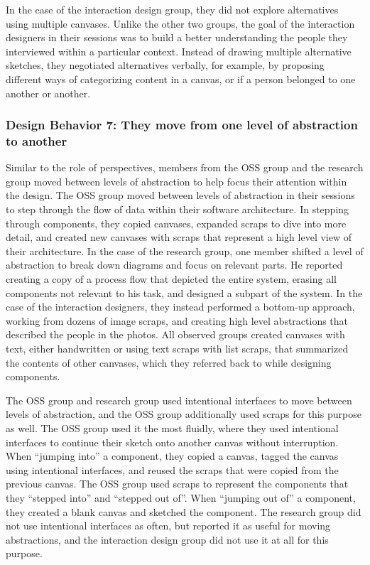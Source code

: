In the case of the interaction design group, they did not explore alternatives using multiple canvases. Unlike the other two groups, the goal of the interaction designers in their sessions was to build a better understanding the people they interviewed within a particular context. Instead of drawing multiple alternative sketches, they negotiated alternatives verbally, for example, by proposing different ways of categorizing content in a canvas, or if a person belonged to one another or another.

\subsubsection{Design Behavior 7: They move from one level of abstraction to another}

Similar to the role of perspectives, members from the OSS group and the research group moved between levels of abstraction to help focus their attention within the design. The OSS group moved between levels of abstraction in their sessions to step through the flow of data within their software architecture. In stepping through components, they copied canvases, expanded scraps to dive into more detail, and created new canvases with scraps that represent a high level view of their architecture. In the case of the research group, one member shifted a level of abstraction to break down diagrams and focus on relevant parts. He reported creating a copy of a process flow that depicted the entire system, erasing all components not relevant to his task, and designed a subpart of the system. In the case of the interaction designers, they instead performed a bottom-up approach, working from dozens of image scraps, and creating high level abstractions that described the people in the photos. All observed groups created canvases with text, either handwritten or using text scraps with list scraps, that summarized the contents of other canvases, which they referred back to while designing components. 

The OSS group and research group used intentional interfaces to move between levels of abstraction, and the OSS group additionally used scraps for this purpose as well. The OSS group used it the most fluidly, where they used intentional interfaces to continue their sketch onto another canvas without interruption. When ``jumping into'' a component, they copied a canvas, tagged the canvas using intentional interfaces, and reused the scraps that were copied from the previous canvas.  The OSS group used scraps to represent the components that they ``stepped into'' and ``stepped out of''. When ``jumping out of'' a component, they created a blank canvas and sketched the component. The research group did not use intentional interfaces as often, but reported it as useful for moving abstractions, and the interaction design group did not use it at all for this purpose.

